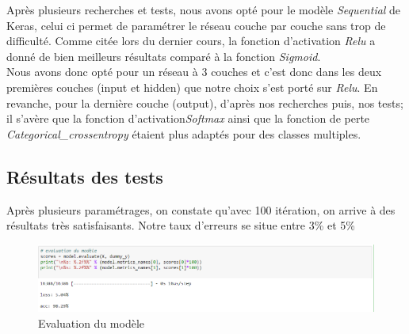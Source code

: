 \documentclass[11pt]{article}
\begin{document}
Après plusieurs recherches et tests, nous avons opté pour le modèle \textit{Sequential} de Keras, celui ci permet de paramétrer le réseau couche par couche sans trop de difficulté. \newline \newline
Comme citée lors du dernier cours, la fonction d'activation \textit{Relu} a donné de bien meilleurs résultats comparé à la fonction \textit{Sigmoid}.\\ Nous avons donc opté pour un réseau à 3 couches et c'est donc dans les deux premières couches (input et hidden) que notre choix s'est porté sur \textit{Relu}. \newline \newline
En revanche, pour la dernière couche (output), d'après nos recherches puis, nos tests; il s'avère que la fonction d'activation\textit{Softmax} ainsi que la fonction de perte \textit{Categorical\_crossentropy} étaient plus adaptés pour des classes multiples. \newline


\subsection{Résultats des tests}


Après plusieurs paramétrages, on constate qu'avec 100 itération, on arrive à des résultats très satisfaisants. Notre taux d'erreurs se situe entre 3\% et 5\% \newline \newline

\begin{figure}[!htb]
  \centering
    \caption{Evaluation du modèle}
    \includegraphics[width=\textwidth]{loss.png}
    \end{figure}
    
\end{document}

